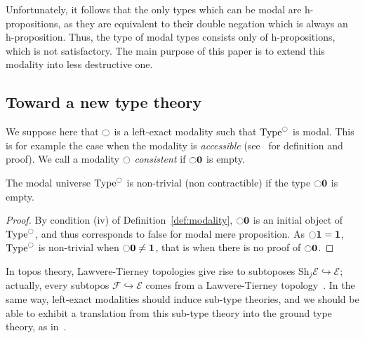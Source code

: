 \documentclass[notfinal]{jfrarticle}
\DeclareMathOperator{\Type}{Type}
\newcommand{\modal}{\ensuremath{\ocircle}}
\newcommand \Sh[1] {\mathrm{Sh}_{#1}}
\newcommand \zero {\mathbf{0}}
\newcommand \one {\mathbf{1}}
\begin{document}
Unfortunately, it follows that the only types which can be modal are
h-propositions, as they are equivalent to their double negation which
is always an h-proposition. Thus, the type of modal types consists
only of h-propositions, which is not satisfactory. The main purpose of this
paper is to extend this
modality into less destructive one.

\subsection{Toward a new type theory}
\label{ssec:new-type-theories}


We suppose here that $\modal$ is a left-exact modality such that
$\Type^\modal$ is modal.
This is for example the case when the modality is {\em accessible}
(see~\cite{hottlib} for definition and proof).
We call a modality $\modal$ {\em consistent} if $\modal\zero$
is empty.
\begin{prop}
  The modal universe $\Type^\modal$ is non-trivial (non contractible) if the type $\modal
  \zero$ is empty.
\end{prop}
\begin{proof}
  By condition (iv) of Definition~\ref{def:modality},
  $\modal \zero$ is an initial object of $\Type^\modal$, and thus
  corresponds to false for modal mere proposition.
  As $\modal \one = \one$, $\Type^\modal$ is non-trivial when
  $\modal \zero \neq \one$, that is when there is no proof of
  $\modal \zero$.
\end{proof}

In topos theory, Lawvere-Tierney topologies give rise to subtoposes
$\Sh{j}\mathcal E \hookrightarrow \mathcal E$; actually, every
subtopos $\mathcal F \hookrightarrow \mathcal E$ comes from a
Lawvere-Tierney topology~\cite[Corollary VII.4.7]{maclanemoerdijk}.
In the same way, left-exact modalities should induce sub-type
theories, and we should be able to exhibit a translation from this
sub-type theory into the ground type theory, as in~\cite{forcing2016}.

\end{document}
